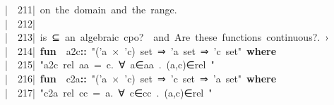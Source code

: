 \documentclass{article}
\newcommand{\syntaxCOMMENTC}[1]{\textcolor[rgb]{0.4,0.0,0.8}{#1}}
\newcommand{\syntaxKEYWORDA}[1]{\textcolor[rgb]{0.0,0.4,0.6}{\textbf{#1}}}
\newcommand{\syntaxKEYWORDB}[1]{\textcolor[rgb]{0.0,0.6,0.4}{\textbf{#1}}}
\newcommand{\syntaxLITERALA}[1]{\textcolor[rgb]{1.0,0.0,0.8}{#1}}
\newcommand{\syntaxOPERATOR}[1]{\textcolor[rgb]{0.0,0.0,0.0}{\textbf{#1}}}
\newcommand{\syntaxCOMMENTC}[1]{\textcolor[rgb]{0.4,0.0,0.8}{#1}}
\newcommand{\syntaxKEYWORDA}[1]{\textcolor[rgb]{0.0,0.4,0.6}{\textbf{#1}}}
\newcommand{\syntaxKEYWORDB}[1]{\textcolor[rgb]{0.0,0.6,0.4}{\textbf{#1}}}
\newcommand{\syntaxLITERALA}[1]{\textcolor[rgb]{1.0,0.0,0.8}{#1}}
\newcommand{\syntaxOPERATOR}[1]{\textcolor[rgb]{0.0,0.0,0.0}{\textbf{#1}}}
\newcommand{\syntaxCOMMENTC}[1]{\textcolor[rgb]{0.4,0.0,0.8}{#1}}
\newcommand{\syntaxKEYWORDA}[1]{\textcolor[rgb]{0.0,0.4,0.6}{\textbf{#1}}}
\newcommand{\syntaxKEYWORDB}[1]{\textcolor[rgb]{0.0,0.6,0.4}{\textbf{#1}}}
\newcommand{\syntaxLITERALA}[1]{\textcolor[rgb]{1.0,0.0,0.8}{#1}}
\newcommand{\syntaxOPERATOR}[1]{\textcolor[rgb]{0.0,0.0,0.0}{\textbf{#1}}}
\newcommand{\syntaxCOMMENTC}[1]{\textcolor[rgb]{0.4,0.0,0.8}{\textbf{#1}}}
\newcommand{\syntaxKEYWORDA}[1]{\textcolor[rgb]{0.0,0.4,0.6}{#1}}
\newcommand{\syntaxKEYWORDB}[1]{\textcolor[rgb]{0.0,0.6,0.4}{#1}}
\newcommand{\syntaxLITERALA}[1]{\textcolor[rgb]{1.0,0.0,0.8}{\textbf{#1}}}
\newcommand{\syntaxOPERATOR}[1]{\textcolor[rgb]{0.0,0.0,0.0}{#1}}
\newcommand{\syntaxCOMMENTC}[1]{\textcolor[rgb]{0.4,0.0,0.8}{#1}}
\newcommand{\syntaxKEYWORDA}[1]{\textcolor[rgb]{0.0,0.4,0.6}{\textbf{#1}}}
\newcommand{\syntaxKEYWORDB}[1]{\textcolor[rgb]{0.0,0.6,0.4}{\textbf{#1}}}
\newcommand{\syntaxLITERALA}[1]{\textcolor[rgb]{1.0,0.0,0.8}{#1}}
\newcommand{\syntaxOPERATOR}[1]{\textcolor[rgb]{0.0,0.0,0.0}{\textbf{#1}}}
\newcommand{\syntaxCOMMENTC}[1]{\textcolor[rgb]{0.4,0.0,0.8}{#1}}
\newcommand{\syntaxKEYWORDA}[1]{\textcolor[rgb]{0.0,0.4,0.6}{\textbf{#1}}}
\newcommand{\syntaxKEYWORDB}[1]{\textcolor[rgb]{0.0,0.6,0.4}{\textbf{#1}}}
\newcommand{\syntaxLITERALA}[1]{\textcolor[rgb]{1.0,0.0,0.8}{#1}}
\newcommand{\syntaxOPERATOR}[1]{\textcolor[rgb]{0.0,0.0,0.0}{\textbf{#1}}}
\newcommand{\syntaxCOMMENTC}[1]{\textcolor[rgb]{0.0,0.0,0.0}{#1}}
\newcommand{\syntaxKEYWORDA}[1]{\textcolor[rgb]{0.0,0.0,0.0}{#1}}
\newcommand{\syntaxKEYWORDB}[1]{\textcolor[rgb]{0.0,0.0,0.0}{#1}}
\newcommand{\gutter}[1]{\textcolor[rgb]{0,0,0}{{|}#1}}
\newcommand{\gutterH}[1]{\textcolor[rgb]{1,0,0}{{|}#1}}
\begin{document}
\gutter{\ \ 211{|}\ }\syntaxCOMMENTC{on{\ }the{\ }domain{\ }and{\ }the{\ }range.}\hspace*{\fill}\\
\gutter{\ \ 212{|}\ }\hspace*{\fill}\\
\gutter{\ \ 213{|}\ }\syntaxCOMMENTC{i}\syntaxCOMMENTC{s}\syntaxCOMMENTC{{\ }}\syntaxCOMMENTC{⊆}\syntaxCOMMENTC{{\ }}\syntaxCOMMENTC{a}\syntaxCOMMENTC{n}\syntaxCOMMENTC{{\ }}\syntaxCOMMENTC{a}\syntaxCOMMENTC{l}\syntaxCOMMENTC{g}\syntaxCOMMENTC{e}\syntaxCOMMENTC{b}\syntaxCOMMENTC{r}\syntaxCOMMENTC{a}\syntaxCOMMENTC{i}\syntaxCOMMENTC{c}\syntaxCOMMENTC{{\ }}\syntaxCOMMENTC{c}\syntaxCOMMENTC{p}\syntaxCOMMENTC{o}\syntaxCOMMENTC{?}\syntaxCOMMENTC{{\ }}\syntaxCOMMENTC{{\ }}\syntaxCOMMENTC{a}\syntaxCOMMENTC{n}\syntaxCOMMENTC{d}\syntaxCOMMENTC{{\ }}\syntaxCOMMENTC{A}\syntaxCOMMENTC{r}\syntaxCOMMENTC{e}\syntaxCOMMENTC{{\ }}\syntaxCOMMENTC{t}\syntaxCOMMENTC{h}\syntaxCOMMENTC{e}\syntaxCOMMENTC{s}\syntaxCOMMENTC{e}\syntaxCOMMENTC{{\ }}\syntaxCOMMENTC{f}\syntaxCOMMENTC{u}\syntaxCOMMENTC{n}\syntaxCOMMENTC{c}\syntaxCOMMENTC{t}\syntaxCOMMENTC{i}\syntaxCOMMENTC{o}\syntaxCOMMENTC{n}\syntaxCOMMENTC{s}\syntaxCOMMENTC{{\ }}\syntaxCOMMENTC{c}\syntaxCOMMENTC{o}\syntaxCOMMENTC{n}\syntaxCOMMENTC{t}\syntaxCOMMENTC{i}\syntaxCOMMENTC{n}\syntaxCOMMENTC{u}\syntaxCOMMENTC{o}\syntaxCOMMENTC{u}\syntaxCOMMENTC{s}\syntaxCOMMENTC{?}\syntaxCOMMENTC{.}\syntaxCOMMENTC{{\ }}\syntaxCOMMENTC{›}\hspace*{\fill}\\
\gutter{\ \ 214{|}\ }\syntaxKEYWORDA{fun}{\ }{\ }a2c\syntaxOPERATOR{::}{\ }\syntaxLITERALA{"('a{\ }×{\ }'c){\ }set{\ }⇒{\ }'a{\ }set{\ }⇒{\ }'c{\ }set"}{\ }\syntaxKEYWORDB{where}{\ }\hspace*{\fill}\\
\gutterH{\ \ 215{|}\ }\syntaxLITERALA{"a2c{\ }rel{\ }aa{\ }={\ }\usebox{\opencurlybracket}c.{\ }∀{\ }a∈aa{\ }.{\ }(a,c)∈rel{\ }\usebox{\closecurlybracket}{\ }"}\hspace*{\fill}\\
\gutter{\ \ 216{|}\ }\syntaxKEYWORDA{fun}{\ }{\ }c2a\syntaxOPERATOR{::}{\ }\syntaxLITERALA{"('a{\ }×{\ }'c){\ }set{\ }⇒{\ }'c{\ }set{\ }⇒{\ }'a{\ }set"}{\ }\syntaxKEYWORDB{where}{\ }\hspace*{\fill}\\
\gutter{\ \ 217{|}\ }\syntaxLITERALA{"c2a{\ }rel{\ }cc{\ }={\ }\usebox{\opencurlybracket}a.{\ }∀{\ }c∈cc{\ }.{\ }(a,c)∈rel{\ }\usebox{\closecurlybracket}{\ }"}\hspace*{\fill}\\
\end{document}
